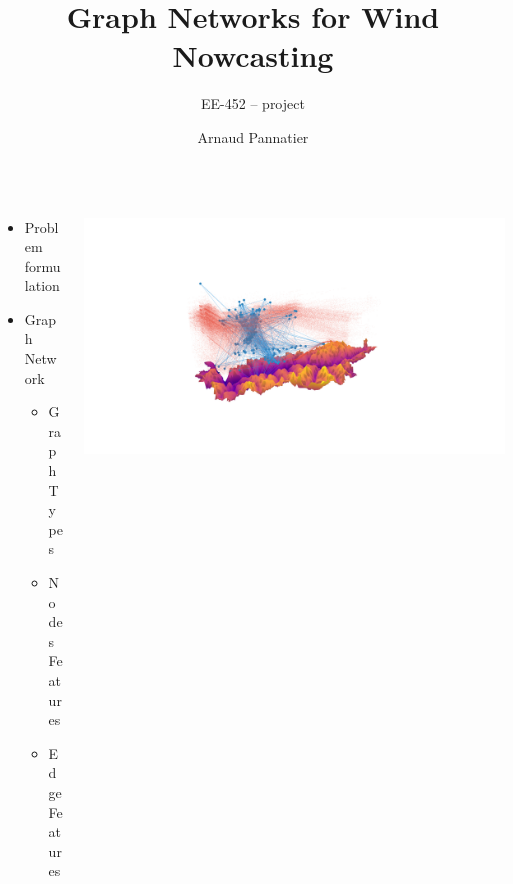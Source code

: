 \documentclass[aspectratio=169]{beamer}
\author[A. Pannatier]{Arnaud Pannatier}
\title{Graph Networks for Wind Nowcasting}
\subtitle{EE-452 -- project}
\begin{document}
\maketitle

\begin{frame}
    \begin{columns}
        \begin{column}{0.4\textwidth}

            \begin{itemize}
                \item Problem formulation
                \item Graph Network
                      \begin{itemize}
                          \item Graph Types
                          \item Nodes Features
                          \item Edge Features
                      \end{itemize}
            \end{itemize}

        \end{column}
        \begin{column}{0.6\textwidth}
            \centering
            \includegraphics[trim={13cm 6cm 15cm 8cm},clip,width=\textwidth]{imgs/south-gen.png}
        \end{column}
    \end{columns}
\end{frame}
\end{document}
